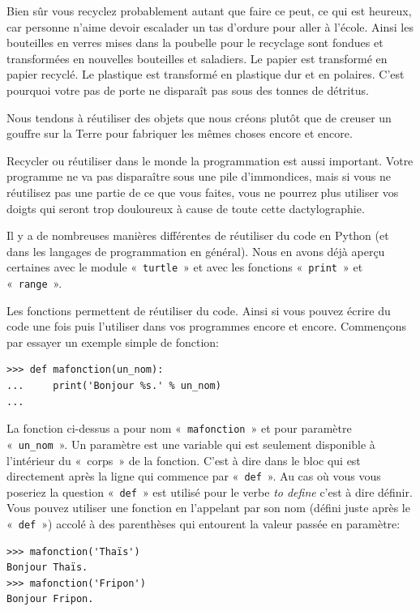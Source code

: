 Bien sûr vous recyclez probablement autant que faire ce peut, ce qui est heureux, car personne n'aime devoir escalader un tas d'ordure pour aller à l'école. Ainsi les bouteilles en verres mises dans la poubelle pour le recyclage sont fondues et transformées en nouvelles bouteilles et saladiers. Le papier est transformé en papier recyclé. Le plastique est transformé en plastique dur et en polaires. C'est pourquoi votre pas de porte ne disparaît pas sous des tonnes de détritus.

Nous tendons à réutiliser des objets que nous créons plutôt que de creuser un gouffre sur la Terre pour fabriquer les mêmes choses encore et encore.

Recycler ou réutiliser dans le monde la programmation est aussi important. Votre programme ne va pas disparaître sous une pile d'immondices, mais si vous ne réutilisez pas une partie de ce que vous faites, vous ne pourrez plus utiliser vos doigts qui seront trop douloureux à cause de toute cette dactylographie.

Il y a de nombreuses manières différentes de réutiliser du code en Python (et dans les langages de programmation en général). Nous en avons déjà aperçu certaines avec le module « \texttt{turtle} » et avec les fonctions « \texttt{print} » et « \texttt{range} ».

Les fonctions permettent de réutiliser du code. Ainsi si vous pouvez écrire du code une fois puis l'utiliser dans vos programmes encore et encore. Commençons par essayer un exemple simple de fonction:

\begin{Verbatim}[frame=single,rulecolor=\color{mbleu}, label=à taper]
>>> def mafonction(un_nom):
...     print('Bonjour %s.' % un_nom)
...
\end{Verbatim}

La fonction ci-dessus a pour nom « \texttt{mafonction} » et pour paramètre « \texttt{un\_nom} ».
Un paramètre est une variable qui est seulement disponible à l'intérieur du « corps » de la fonction. 
C'est à dire dans le bloc qui est directement après la ligne qui commence par « \texttt{def} ». Au cas où vous vous poseriez la question « \texttt{def} » est utilisé pour le verbe \emph{to define} c'est à dire définir. Vous pouvez utiliser une fonction en l'appelant par son nom (défini juste après le « \texttt{def} ») accolé à des parenthèses  qui entourent la valeur passée en paramètre:

\begin{Verbatim}[frame=single,rulecolor=\color{mbleu}, label=à taper]
>>> mafonction('Thaïs')
Bonjour Thaïs.
>>> mafonction('Fripon')
Bonjour Fripon.
\end{Verbatim}


